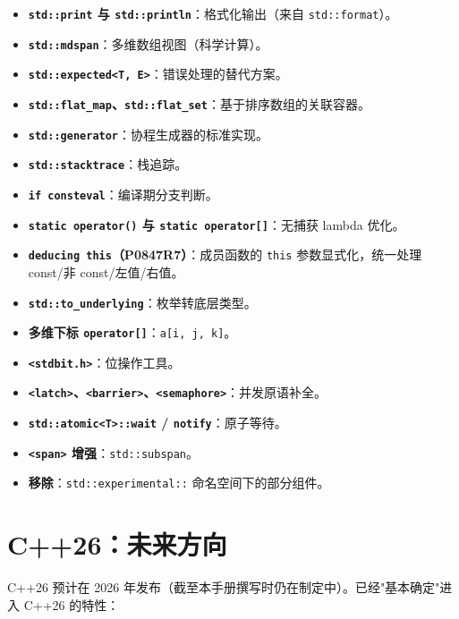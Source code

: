 \documentclass[12pt,a4paper,fontset=fandol]{ctexbook}
\newcommand{\yearlabel}[1]{%
  \tcbox[on line,colback=yearheadbg,colframe=yearheadbg,
    boxrule=0pt,arc=1pt,left=3pt,right=3pt,top=1pt,bottom=1pt,
    colupper=white,fontupper=\scriptsize\bfseries]{#1}}
\newcommand{\kw}[1]{\texttt{#1}}
\newcommand{\yrlbl}[1]{\yearlabel{#1}}
\begin{document}
\begin{itemize}
  \item \textbf{\kw{std::print} 与 \kw{std::println}}：格式化输出（来自 \kw{std::format}）。
  \item \textbf{\kw{std::mdspan}}：多维数组视图（科学计算）。
  \item \textbf{\kw{std::expected<T, E>}}：错误处理的替代方案。
  \item \textbf{\kw{std::flat\_map}、\kw{std::flat\_set}}：基于排序数组的关联容器。
  \item \textbf{\kw{std::generator}}：协程生成器的标准实现。
  \item \textbf{\kw{std::stacktrace}}：栈追踪。
  \item \textbf{\kw{if consteval}}：编译期分支判断。
  \item \textbf{\kw{static operator()} 与 \kw{static operator[]}}：无捕获 lambda 优化。
  \item \textbf{\kw{deducing this}（P0847R7）}：成员函数的 \kw{this} 参数显式化，统一处理 const/非 const/左值/右值。
  \item \textbf{\kw{std::to\_underlying}}：枚举转底层类型。
  \item \textbf{多维下标 \kw{operator[]}}：\kw{a[i, j, k]}。
  \item \textbf{\kw{<stdbit.h>}}：位操作工具。
  \item \textbf{\kw{<latch>}、\kw{<barrier>}、\kw{<semaphore>}}：并发原语补全。
  \item \textbf{\kw{std::atomic<T>::wait} / \kw{notify}}：原子等待。
  \item \textbf{\kw{<span>} 增强}：\kw{std::subspan}。
  \item \textbf{移除}：\kw{std::experimental::} 命名空间下的部分组件。
\end{itemize}

\section{C++26：未来方向}

\yrlbl{2026} C++26 预计在 2026 年发布（截至本手册撰写时仍在制定中）。已经"基本确定"进入 C++26 的特性：
\end{document}
